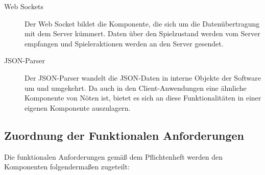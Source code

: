 \begin{description}
			\item[Web Sockets]
			Der Web Socket bildet die Komponente, die sich um die Datenübertragung mit dem Server kümmert. Daten über den Spielzustand werden vom Server empfangen und Spieleraktionen werden an den Server gesendet.
			
			\item[JSON-Parser]
			Der JSON-Parser wandelt die JSON-Daten in interne Objekte der Software um und umgekehrt. Da auch in den Client-Anwendungen eine ähnliche Komponente von Nöten ist, bietet es sich an diese Funktionalitäten in einer eigenen Komponente auszulagern.  

		\end{description}
		
	\subsection{Zuordnung der Funktionalen Anforderungen}
	
	Die funktionalen Anforderungen gemäß dem Pflichtenheft werden den Komponenten folgendermaßen zugeteilt:
	
